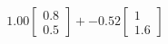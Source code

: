 \documentclass[preview]{standalone}
\begin{document}
\begin{align*}
1.00 \begin{bmatrix} 0.8 \\ 0.5 \end{bmatrix} + -0.52 \begin{bmatrix} 1 \\ 1.6 \end{bmatrix}
\end{align*}
\end{document}

